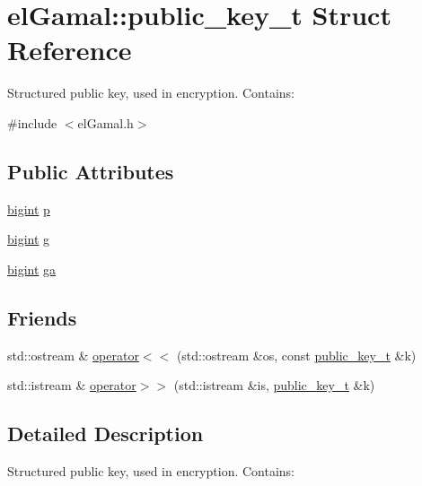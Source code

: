 \hypertarget{structelGamal_1_1public__key__t}{}\section{el\+Gamal\+:\+:public\+\_\+key\+\_\+t Struct Reference}
\label{structelGamal_1_1public__key__t}


Structured public key, used in encryption. Contains\+:  




{\ttfamily \#include $<$el\+Gamal.\+h$>$}

\subsection*{Public Attributes}
\begin{DoxyCompactItemize}
\item 
\mbox{\hyperlink{namespaceelGamal_ab2883bf41ce8d738e2428c8ae81b0245}{bigint}} \mbox{\hyperlink{structelGamal_1_1public__key__t_a0f62fb91be391d0ca4abfa147626a0c8}{p}}
\item 
\mbox{\hyperlink{namespaceelGamal_ab2883bf41ce8d738e2428c8ae81b0245}{bigint}} \mbox{\hyperlink{structelGamal_1_1public__key__t_aa54f804adb7e54538f1e34e7737167e7}{g}}
\item 
\mbox{\hyperlink{namespaceelGamal_ab2883bf41ce8d738e2428c8ae81b0245}{bigint}} \mbox{\hyperlink{structelGamal_1_1public__key__t_ad3a62139e6cffaffbb03178eff18ea76}{ga}}
\end{DoxyCompactItemize}
\subsection*{Friends}
\begin{DoxyCompactItemize}
\item 
std\+::ostream \& \mbox{\hyperlink{structelGamal_1_1public__key__t_a046edae80d5819c231b4c2dc64986202}{operator$<$$<$}} (std\+::ostream \&os, const \mbox{\hyperlink{structelGamal_1_1public__key__t}{public\+\_\+key\+\_\+t}} \&k)
\item 
std\+::istream \& \mbox{\hyperlink{structelGamal_1_1public__key__t_a9d8e3db0096733e107dfb53f121c9e8e}{operator$>$$>$}} (std\+::istream \&is, \mbox{\hyperlink{structelGamal_1_1public__key__t}{public\+\_\+key\+\_\+t}} \&k)
\end{DoxyCompactItemize}


\subsection{Detailed Description}
Structured public key, used in encryption. Contains\+: 



